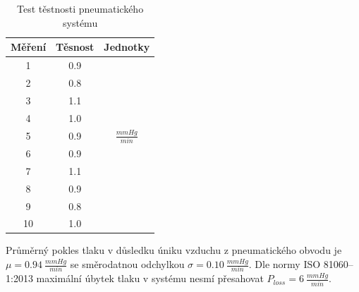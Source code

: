 \begin{table}[H]
    \label{tab:pressure_test_pneu}
    \caption{Test těstnosti pneumatického systému}
    \begin{ctucolortab}
        \begin{tabular}{ccc}
            \toprule
            Měření & Těsnost & Jednotky           \\ \midrule
            1      & 0.9     &                    \\
            2      & 0.8     &                    \\
            3      & 1.1     &                    \\
            4      & 1.0     &                    \\
            5      & 0.9     & $\frac{mmHg}{min}$ \\
            6      & 0.9     &                    \\
            7      & 1.1     &                    \\
            8      & 0.9     &                    \\
            9      & 0.8     &                    \\
            10     & 1.0     &                    \\
            \bottomrule
        \end{tabular}
    \end{ctucolortab}
\end{table}
Průměrný pokles tlaku v důsledku úniku vzduchu z pneumatického obvodu je $\mu = 0.94 \ \frac{mmHg}{min}$ se směrodatnou odchylkou $\sigma = 0.10  \ \frac{mmHg}{min}$.
Dle normy ISO 81060–1:2013 maximální úbytek tlaku v systému nesmí přesahovat $P_{loss} = 6 \ \frac{mmHg}{min}$.
\pagebreak
